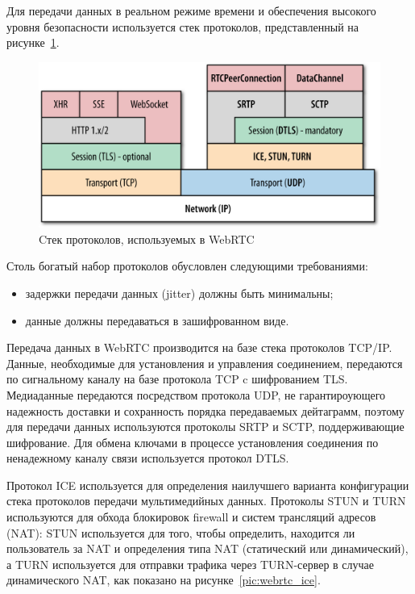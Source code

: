 Для передачи данных в реальном режиме времени и обеспечения высокого уровня
безопасности используется стек протоколов, представленный на рисунке~\ref{pic:webrtc_stack}.

\begin{figure}[h!]
  \centering
  \includegraphics[width=150mm]{pic/webrtc_stack.png}
  \caption{Cтек протоколов, используемых в WebRTC}
  \label{pic:webrtc_stack}
\end{figure}

Столь богатый набор протоколов обусловлен следующими требованиями:
\begin{itemize}
\item задержки передачи данных (jitter) должны быть минимальны;
\item данные должны передаваться в зашифрованном виде.
\end{itemize}

Передача данных в WebRTC производится на базе стека протоколов TCP/IP.
Данные, необходимые для установления и управления соединением, передаются 
по сигнальному каналу на базе протокола TCP c шифрованием TLS.
Медиаданные передаются посредством протокола UDP, не гарантироующего надежность
доставки и сохранность порядка передаваемых дейтаграмм, 
поэтому для передачи данных используются протоколы SRTP и SCTP, поддерживающие 
шифрование. 
Для обмена ключами в процессе установления соединения по ненадежному каналу связи
используется протокол DTLS.

Протокол ICE используется для определения наилучшего варианта конфигурации стека протоколов
передачи мультимедийных данных.
Протоколы STUN и TURN используются для обхода блокировок firewall и
систем трансляций адресов (NAT):
STUN используется для того, чтобы определить, находится ли пользователь за NAT и
определения типа NAT (статический или динамический), а TURN используется для
отправки трафика через TURN-сервер в случае динамического NAT, 
как показано на рисунке~\ref{pic:webrtc_ice}.

